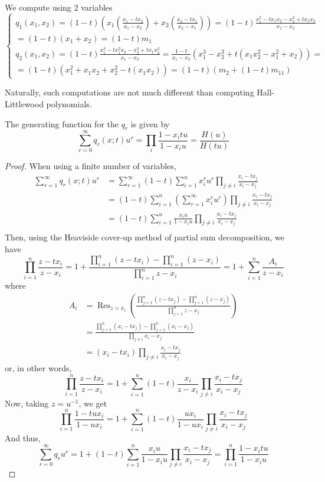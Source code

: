 \documentclass[11pt,leqno,oneside]{amsart}
\numberwithin{thm}{section}
\begin{document}
\begin{example}
  We compute using \(2\) variables \[
    \begin{cases}
      q_1(x_1,x_2) = (1-t) \left(x_1\left( \frac{x_1-tx_2}{x_1-x_2}
        \right)+x_2\left( \frac{x_2-tx_1}{x_2-x_1} \right)\right) =
      (1-t) \frac{x_1^2-tx_1x_2-x_2^2+tx_1x_2}{x_1-x_2} \\ =
      (1-t)(x_1+x_2) = (1-t)m_1 \\
      q_2(x_1,x_2) =
      (1-t)\frac{x_1^3-tx_1^2x_2-x_2^3+tx_1x_2^2}{x_1-x_2} =
      \frac{1-t}{x_1-x_2}(x_1^3-x_2^3 + t(x_1 x_2^2 - x_1^2+x_2)) = \\
      = (1-t)(x_1^2+x_1 x_2 + x_2^2 - t(x_1 x_2)) = (1-t)(m_2+(1-t)m_{11})
    \end{cases}
  \]
\end{example}
Naturally, such computations are not much different than computing
Hall-Littlewood polynomials.
\begin{prop}\label{qr-gen-fn}
  The generating function for the \(q_r\) is given by \[
    \sum_{r=0}^\infty q_r(x;t) u^r = \prod_i \frac{1-x_i t u}{1 - x_i
      u} = \frac{H(u)}{H(tu)}
  \]
\end{prop}
\begin{proof}
  When using a finite number of variables,
  \begin{align*}
    \sum_{r=1}^\infty q_r(x;t) u^r
    & = \sum_{r=1}^\infty (1-t) \sum_{i=1}^n x_i^r u^r \prod_{j \neq i}
      \frac{x_i-tx_j}{x_i-x_j}  \\
    & = (1-t)  \sum_{i=1}^n \left(\sum_{r=1}^\infty x_i^r u^r\right)
      \prod_{j \neq i} \frac{x_i-tx_j}{x_i-x_j} \\
    & = (1-t) \sum_{i=1}^n \frac{x_i u}{1-x_i u} \prod_{j \neq i}
      \frac{x_i-tx_j}{x_i-x_j} \\
  \end{align*}
  Then, using the Heaviside cover-up method of partial sum
  decomposition, we have \[ 
    \prod_{i=1}^n \frac{z- t x_i}{z - x_i} = 1 + \frac{\prod_{i=1}^n (z
    - t x_i)-\prod_{i=1}^n (z - x_i)}{\prod_{i=1}^n z-x_i} = 1 + \sum_{i=1}^n \frac{A_i}{z-x_i}
  \]
  where
  \begin{align*}
    A_i & = \operatorname{Res}_{z=x_i}\left(  \frac{ \prod_{j=1}^n (z- t
        x_j) - \prod_{j=1}^n (z-x_j)}{\prod_{j=1}^n z - x_j} \right)
    \\
    & = \frac{\prod_{j=1}^n (x_i-t
      x_j) - \prod_{j=1}^n (x_i - x_j)}{\prod_{j \neq i} x_i-x_j} \\
    & = (x_i-tx_i) \prod_{j \neq i}\frac{x_i-t
    x_j}{ x_i - x_j}
  \end{align*}
  or, in other words, \[
    \prod_{i=1}^n \frac{z- t x_i}{z - x_i} = 1+\sum_{i=1}^n
    (1-t)\frac{x_i}{z-x_i} \prod_{j \neq i}\frac{x_i-t
    x_j}{ x_i - x_j}
  \]
  Now, taking \(z = u^{-1}\), we get \[
    \prod_{i=1}^n \frac{1-t u x_i}{1 - u x_i} = 1+\sum_{i=1}^n
    (1-t)\frac{u x_i}{1- u x_i} \prod_{j \neq i}\frac{x_i-t
    x_j}{ x_i - x_j}
  \]
  And thus, \[
    \sum_{r=0}^\infty q_r u^r = 1 + (1-t) \sum_{i=1}^n \frac{x_i u}{1-x_i u} \prod_{j \neq i}
      \frac{x_i-tx_j}{x_i-x_j} = \prod_{i=1}^n \frac{1-x_i t u}{1-x_i u}
  \]
\end{proof}
\end{document}
